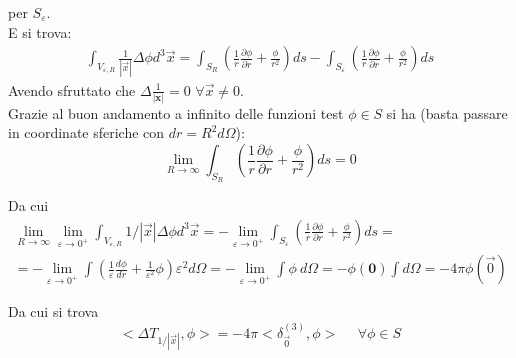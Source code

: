 \documentclass[twoside]{article}
\renewcommand{\vec}[1]{\textbf{#1}}
\begin{document}
per $S_\varepsilon$. \\
E si trova:
\begin{align}
    \int_{V_{\varepsilon,R}}\frac{1}{|\Vec{x}|}\Delta \phi d^3 \Vec{x}
    =\int_{S_R}\left( \frac{1}{r}\frac{\partial \phi}{\partial r}+\frac{\phi}{r^2} \right)ds - \int_{S_{\varepsilon}}\left( \frac{1}{r}\frac{\partial \phi}{\partial r}+\frac{\phi}{r^2} \right)ds
\end{align}
Avendo sfruttato che $\Delta\frac{1}{|\vec{x}|}=0$ $\forall \Vec{x}\ne 0$.\\
Grazie al buon andamento a infinito delle funzioni test $\phi \in S$ si ha (basta passare in coordinate sferiche con $dr=R^2 d\Omega$):
\begin{equation}
    \lim_{R\to \infty}\int_{S_R}\left( \frac{1}{r}\frac{\partial \phi}{\partial r}+\frac{\phi}{r^2} \right)ds=0
\end{equation}

Da cui
\begin{equation}\begin{split}
   \lim_{R\to \infty} \lim_{\varepsilon \to 0^+} \int_{V_{\varepsilon,R}}1/|\Vec{x}|\Delta \phi d^3 \Vec{x}= - \lim_{\varepsilon \to 0^+} \int_{S_{\varepsilon}}\left( \frac{1}{r}\frac{\partial \phi}{\partial r}+\frac{\phi}{r^2} \right)ds=\\
   =-\lim_{\varepsilon \to 0^+}\int \left( \frac{1}{\varepsilon}\frac{d\phi}{dr}+\frac{1}{\varepsilon^2}\phi \right)\varepsilon^2 d\Omega=-\lim_{\varepsilon \to 0^+}\int \phi \ d\Omega=-\phi(\vec{0})\int d\Omega = -4\pi \phi(\Vec{0})
\end{split}\end{equation}

Da cui si trova
\begin{equation}
    <\Delta T_{1/|\Vec{x}|},\phi>=-4\pi <\delta^{(3)}_{\Vec{0}},\phi> \ \ \ \ \ \ \forall \phi \in S
\end{equation} 



\newpage
\end{document}
